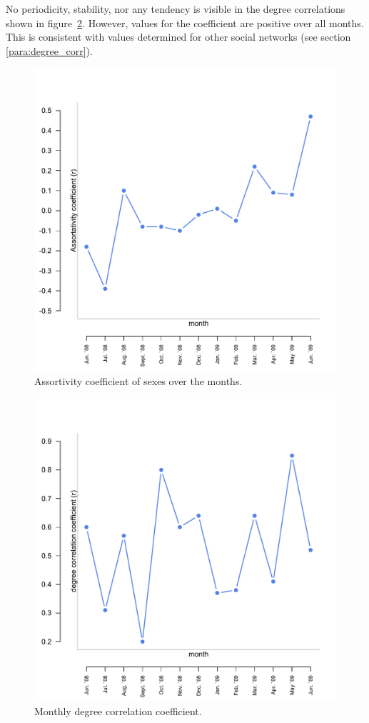 No periodicity, stability, nor any tendency is visible in the degree correlations shown in figure~\ref{fig:long_degree_cor}. However, values for the coefficient are positive over all months. This is consistent with values determined for other social networks (see section \ref{para:degree_corr}).

\begin{figure}[p]
\begin{center}
  \includegraphics[width=.6\textwidth]{assets/pdf/long_gender_corr.pdf}
  \caption[Assortivity coefficient of sexes over the months]{Assortivity coefficient of sexes over the months.}
  \label{fig:long_gender_corr}
\end{center}
\end{figure}  

\begin{figure}[p]
\begin{center}
  \includegraphics[width=.6\textwidth]{assets/pdf/long_degree_corr.pdf}
  \caption[Degree correlation coefficient]{Monthly degree correlation coefficient.}
  \label{fig:long_degree_cor}
\end{center}
\end{figure} 


